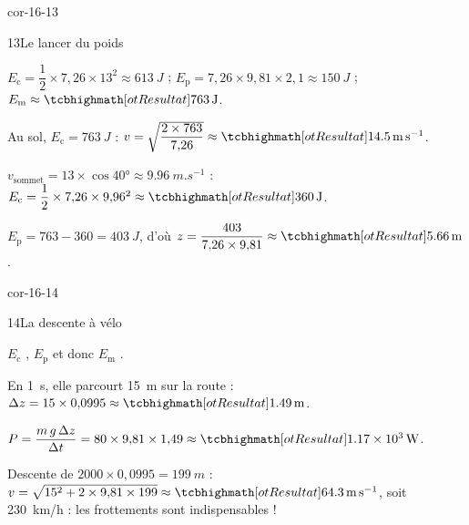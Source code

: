 \begin{blocLivre}{cor-16-13}
\begin{corrige}{13}{Le lancer du poids}
\begin{questions}
\item $E_\mathrm{c}=\dfrac{1}{2}\times7{,}26\times13^2\approx\qty{613}{J}$ ; $E_\mathrm{p}=7{,}26\times9{,}81\times2{,}1\approx\qty{150}{J}$ ; $E_\mathrm{m}\approx\res{\qty{763}{J}}$.
\item Au sol, $E_\mathrm{c}=\qty{763}{J}$ : $v=\sqrt{\dfrac{2\times763}{7{,}26}}\approx\res{\qty{14,5}{m.s^{-1}}}$.
\item $v_\mathrm{sommet}=13\times\cos\ang{40}\approx\qty{9,96}{m.s^{-1}}$ : $E_\mathrm{c}=\dfrac{1}{2}\times7{,}26\times9{,}96^2\approx\res{\qty{360}{J}}$.
\item $E_\mathrm{p}=763-360=\qty{403}{J}$, d'où $z=\dfrac{403}{7{,}26\times9{,}81}\approx\res{\qty{5,66}{m}}$.
\end{questions}
\end{corrige}
\end{blocLivre}
\begin{blocLivre}{cor-16-14}
\begin{corrige}{14}{La descente à vélo}
\begin{questions}
\item $E_\mathrm{c}$ , $E_\mathrm{p}$ et donc $E_\mathrm{m}$ .
\item En \qty{1}{s}, elle parcourt \qty{15}{m} sur la route : $\Delta z=15\times0{,}0995\approx\res{\qty{1,49}{m}}$.
\item $P=\dfrac{m\,g\,\Delta z}{\Delta t}=80\times9{,}81\times1{,}49\approx\res{\qty{1,17e3}{W}}$.
\item Descente de $2000\times0{,}0995=\qty{199}{m}$ : $v=\sqrt{15^2+2\times9{,}81\times199}\approx\res{\qty{64,3}{m.s^{-1}}}$, soit \qty{230}{km/h} : les frottements sont indispensables !
\end{questions}
\end{corrige}
\end{blocLivre}
